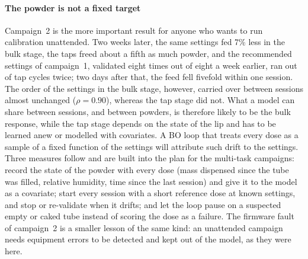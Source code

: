 \documentclass[preprint,12pt]{elsarticle}
\begin{document}
\paragraph{The powder is not a fixed target} Campaign~2 is the more important result for anyone who wants to run calibration unattended. Two weeks later, the same settings fed 7\% less in the bulk stage, the taps freed about a fifth as much powder, and the recommended settings of campaign~1, validated eight times out of eight a week earlier, ran out of tap cycles twice; two days after that, the feed fell fivefold within one session. The order of the settings in the bulk stage, however, carried over between sessions almost unchanged ($\rho = 0.90$), whereas the tap stage did not. What a model can share between sessions, and between powders, is therefore likely to be the bulk response, while the tap stage depends on the state of the lip and has to be learned anew or modelled with covariates. A BO loop that treats every dose as a sample of a fixed function of the settings will attribute such drift to the settings. Three measures follow and are built into the plan for the multi-task campaigns: record the state of the powder with every dose (mass dispensed since the tube was filled, relative humidity, time since the last session) and give it to the model as a covariate; start every session with a short reference dose at known settings, and stop or re-validate when it drifts; and let the loop pause on a suspected empty or caked tube instead of scoring the dose as a failure. The firmware fault of campaign~2 is a smaller lesson of the same kind: an unattended campaign needs equipment errors to be detected and kept out of the model, as they were here.
\end{document}
